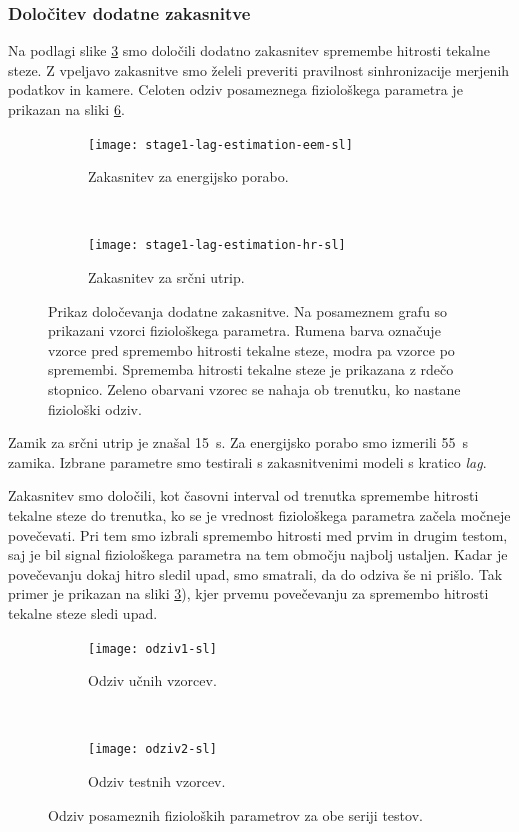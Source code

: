 \subsubsection{Določitev dodatne zakasnitve}
Na podlagi slike \ref{fig:lag-estimation-stage1} smo določili dodatno zakasnitev spremembe hitrosti tekalne steze. Z vpeljavo zakasnitve smo želeli preveriti pravilnost sinhronizacije merjenih podatkov in kamere. Celoten odziv posameznega fiziološkega parametra je prikazan na sliki \ref{fig:odziv-stage1}.


\begin{figure}[!htb]
	\centering
	\begin{subfigure}[t]{0.45\columnwidth}
		\texttt{[image: stage1-lag-estimation-eem-sl]}
		\caption{Zakasnitev za energijsko porabo.}
		\label{fig:lag-estimation-train-eem}
	\end{subfigure}
	~
	\begin{subfigure}[t]{0.45\columnwidth}
		\texttt{[image: stage1-lag-estimation-hr-sl]}
		\caption{Zakasnitev za srčni utrip.}
		\label{fig:lag-estimation-train-hr}
	\end{subfigure}
	\caption[Prikaz določevanja dodatne zakasnitve]{Prikaz določevanja dodatne zakasnitve. Na posameznem grafu so prikazani vzorci fiziološkega parametra. Rumena barva označuje vzorce pred spremembo hitrosti tekalne steze, modra pa vzorce po spremembi. Sprememba hitrosti tekalne steze je prikazana z rdečo stopnico. Zeleno obarvani vzorec se nahaja ob trenutku, ko nastane fiziološki odziv.}
	\label{fig:lag-estimation-stage1}
\end{figure}

Zamik za srčni utrip je znašal \SI{15}{\s}. Za energijsko porabo smo izmerili \SI{55}{\s} zamika. Izbrane parametre smo testirali s zakasnitvenimi modeli s kratico \textit{lag}.

Zakasnitev smo določili, kot časovni interval od trenutka spremembe hitrosti tekalne steze do trenutka, ko se je vrednost fiziološkega parametra začela močneje povečevati. Pri tem smo izbrali spremembo hitrosti med prvim in drugim testom, saj je bil signal fiziološkega parametra na tem območju najbolj ustaljen. Kadar je povečevanju dokaj hitro sledil upad, smo smatrali, da do odziva še ni prišlo. Tak primer je prikazan na sliki \ref{fig:lag-estimation-stage1}), kjer prvemu povečevanju za spremembo hitrosti tekalne steze sledi upad. 


\begin{figure}[!htb]
	\centering
	\begin{subfigure}[t]{0.45\columnwidth}
		\texttt{[image: odziv1-sl]}
		\caption{Odziv učnih vzorcev.}
		\label{fig:odziv-ucnih-stage1}
	\end{subfigure}
	~
	\begin{subfigure}[t]{0.45\columnwidth}
		\texttt{[image: odziv2-sl]}
		\caption{Odziv testnih vzorcev.}
		\label{fig:odziv-testnih-stage1}
	\end{subfigure}
	\caption[Odziv posameznih fizioloških parametrov za obe seriji testov]{Odziv posameznih fizioloških parametrov za obe seriji testov.}
	\label{fig:odziv-stage1}
\end{figure} 


